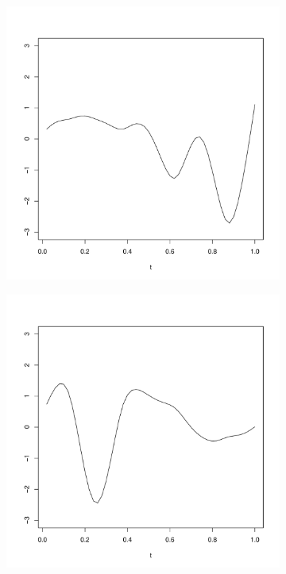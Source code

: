 \begin{figure}
	\begin{subfigure}
		[b]{0.32 
		\textwidth} \centering 
		\includegraphics[width=0.99 
		\textwidth]{Images-future-work/ef3.pdf} \caption{} \label{} 
	\end{subfigure}
	\begin{subfigure}
		[b]{0.32 
		\textwidth} \centering 
		\includegraphics[width=0.99 
		\textwidth]{Images-future-work/ef4.pdf} \caption{} \label{} 
	\end{subfigure}
	

\end{figure}
